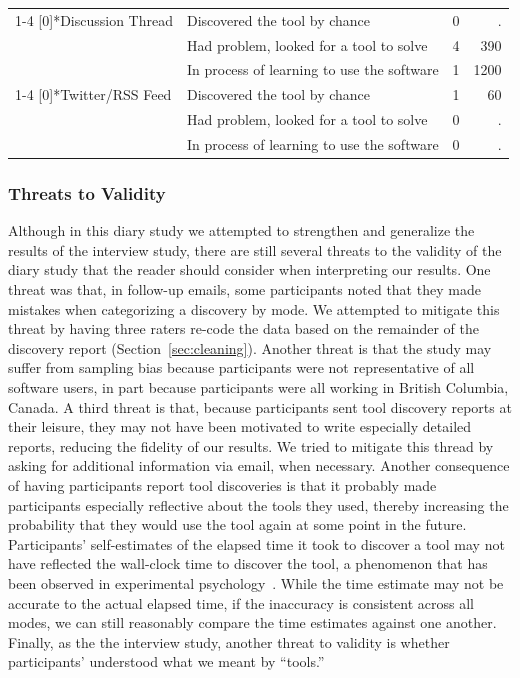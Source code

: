 \documentclass[smallextended]{svjour3}
\newcommand\contexts{modes\xspace}
\begin{document}
\begin{table}[t]
\begin{tabularx}{\linewidth}{p{25mm}Xrr}
    \cline{1-4}
    \multirow{3}[0]{*}{Discussion Thread} & Discovered the tool by chance & 0     & .  \\
          & Had problem, looked for a tool to solve & 4     & 390   \\
          & In process of learning to use the software & 1     & 1200  \\

		\cline{1-4}
    \multirow{3}[0]{*}{Twitter/RSS Feed} & Discovered the tool by chance & 1     & 60   \\
          & Had problem, looked for a tool to solve & 0     & .   \\
          & In process of learning to use the software & 0     & .   \\
	\end{tabularx}
\end{table}

\subsubsection{Threats to Validity}

\noindent
Although in this diary study we attempted to strengthen and generalize
the results of the interview study, there are still several
threats to the validity of the diary study that the reader
should consider when interpreting our results.
One threat was that, in follow-up emails, some participants noted that 
they made mistakes when categorizing a discovery by mode.
We attempted to mitigate this threat by having three raters 
re-code the data based on the remainder
of the discovery report (Section~\ref{sec:cleaning}).
Another threat is that the study may suffer from sampling bias because participants were 
not representative of all software users, in part because 
participants were all working in British Columbia, Canada.
A third threat is that, because participants 
sent tool discovery reports at their leisure, 
they may not have been motivated to write especially detailed reports,
reducing the fidelity of our results.
We tried to mitigate this thread by asking for additional information via
email, when necessary.
Another consequence of having participants report tool discoveries
is that it probably made participants especially reflective about the tools
they used, thereby increasing the probability that they would 
use the tool again at some point in the future.
Participants' self-estimates of the elapsed time it 
took to discover a tool may not have reflected the wall-clock time
to discover the tool, a phenomenon that has been observed
in experimental psychology~\citep{huttenlocher1990reports}.
While the time estimate may not be accurate to the actual elapsed time,
if the inaccuracy is consistent across all \contexts,
we can still reasonably compare the time estimates against one another.
Finally, as the the interview study, another threat to validity is 
whether participants' understood what we meant by ``tools.''
\end{document}
